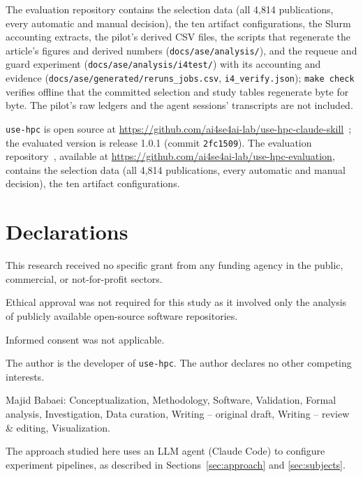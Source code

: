 \documentclass[pdflatex,sn-mathphys-num]{sn-jnl}
\theoremstyle{thmstyletwo}%
\theoremstyle{thmstylethree}%
\newcommand{\tool}{\texttt{use-hpc}}
\newcommand{\code}[1]{\texttt{#1}}
\begin{document}
\backmatter

The evaluation repository contains the selection data (all 4{,}814 publications, every automatic and manual decision), the ten artifact configurations, the Slurm accounting extracts, the pilot's derived CSV files, the scripts that regenerate the article's figures and derived numbers (\code{docs/ase/analysis/}), and the requeue and guard experiment (\code{docs/ase/analysis/i4test/}) with its accounting and evidence (\code{docs/ase/generated/reruns\_jobs.csv}, \code{i4\_verify.json}); \code{make check} verifies offline that the committed selection and study tables regenerate byte for byte. The pilot's raw ledgers and the agent sessions' transcripts are not included.

\tool{} is open source at \url{https://github.com/ai4se4ai-lab/use-hpc-claude-skill}~\cite{usehpc2026repo}; the evaluated version is release 1.0.1 (commit \code{2fc1509}). The evaluation repository~\cite{usehpc2026eval}, available at \url{https://github.com/ai4se4ai-lab/use-hpc-evaluation}, contains the selection data (all 4{,}814 publications, every automatic and manual decision), the ten artifact configurations.


\section*{Declarations}


This research received no specific grant from any funding agency in the public, commercial, or not-for-profit sectors.

Ethical approval was not required for this study as it involved only the analysis of publicly available open-source software repositories.

Informed consent was not applicable.

 The author is the developer of \tool{}. The author declares no other competing interests.


 Majid Babaei: Conceptualization, Methodology, Software, Validation, Formal analysis, Investigation, Data curation, Writing – original draft, Writing – review \& editing, Visualization. 

 The approach studied here uses an LLM agent (Claude Code) to configure experiment pipelines, as described in Sections~\ref{sec:approach} and \ref{sec:subjects}.



\end{document}
